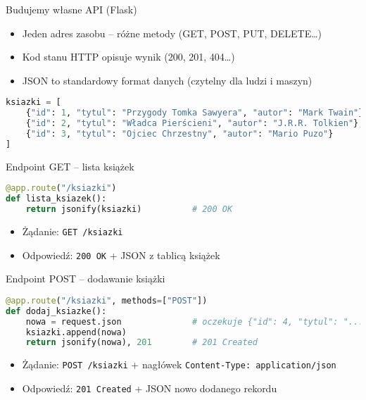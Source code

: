 \documentclass[10pt,compress,usenames,dvipsnames,aspectratio=169]{beamer}
\begin{document}
\begin{frame}[fragile]{Budujemy własne API (Flask)}
  \begin{itemize}
    \item Jeden adres zasobu – różne metody (GET, POST, PUT, DELETE…)
    \item Kod stanu HTTP opisuje wynik (200, 201, 404…)
    \item JSON to standardowy format danych (czytelny dla ludzi i maszyn)
  \end{itemize}

  \vspace{1ex}
  \begin{lstlisting}[style=dark, language=python, basicstyle=\ttfamily\scriptsize\color{fgcode}, numbers=none, xleftmargin=1em, xrightmargin=1em]
ksiazki = [
    {"id": 1, "tytul": "Przygody Tomka Sawyera", "autor": "Mark Twain"},
    {"id": 2, "tytul": "Władca Pierścieni", "autor": "J.R.R. Tolkien"},
    {"id": 3, "tytul": "Ojciec Chrzestny", "autor": "Mario Puzo"}
]
  \end{lstlisting}
\end{frame}

\begin{frame}[fragile]{Endpoint GET – lista książek}
  \begin{lstlisting}[style=dark, language=python, basicstyle=\ttfamily\scriptsize\color{fgcode}, numbers=none, xleftmargin=1em, xrightmargin=1em]
@app.route("/ksiazki")
def lista_ksiazek():
    return jsonify(ksiazki)          # 200 OK
  \end{lstlisting}

  \vspace{1ex}
  \begin{itemize}
    \item Żądanie: \texttt{GET /ksiazki}
    \item Odpowiedź: \texttt{200 OK} + JSON z tablicą książek
  \end{itemize}
\end{frame}


\begin{frame}[fragile]{Endpoint POST – dodawanie książki}
  \begin{lstlisting}[style=dark, language=python, basicstyle=\ttfamily\scriptsize\color{fgcode}, numbers=none, xleftmargin=1em, xrightmargin=1em]
@app.route("/ksiazki", methods=["POST"])
def dodaj_ksiazke():
    nowa = request.json              # oczekuje {"id": 4, "tytul": "...", "autor": "..."}
    ksiazki.append(nowa)
    return jsonify(nowa), 201        # 201 Created
  \end{lstlisting}

  \vspace{1ex}
  \begin{itemize}
    \item Żądanie: \texttt{POST /ksiazki} + nagłówek \texttt{Content-Type: application/json}
    \item Odpowiedź: \texttt{201 Created} + JSON nowo dodanego rekordu
  \end{itemize}
\end{frame}
\end{document}
